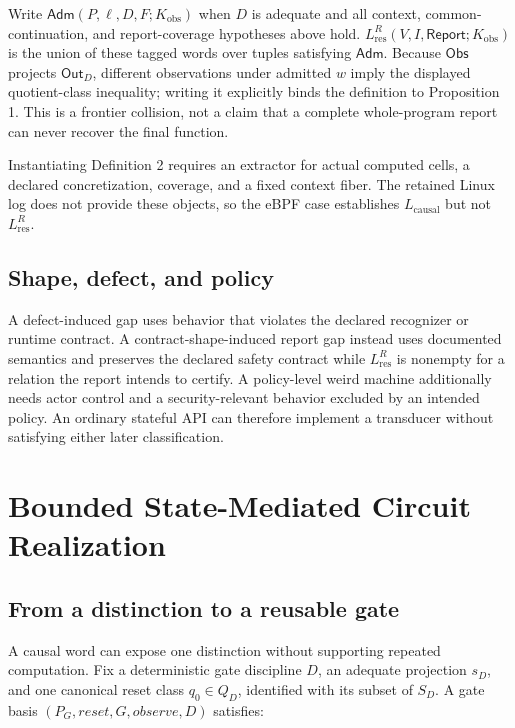 \documentclass[conference]{IEEEtran}
\begin{document}
Write $\mathsf{Adm}(P,\ell,D,F;K_{\mathrm{obs}})$ when $D$ is adequate and all context, common-continuation, and report-coverage hypotheses above hold. $L_{\mathrm{res}}^R(V,I,\mathsf{Report};K_{\mathrm{obs}})$ is the union of these tagged words over tuples satisfying $\mathsf{Adm}$. Because $\mathsf{Obs}$ projects $\mathsf{Out}_D$, different observations under admitted $w$ imply the displayed quotient-class inequality; writing it explicitly binds the definition to Proposition 1. This is a frontier collision, not a claim that a complete whole-program report can never recover the final function.

Instantiating Definition 2 requires an extractor for actual computed cells, a declared concretization, coverage, and a fixed context fiber. The retained Linux log does not provide these objects, so the eBPF case establishes $L_{\mathrm{causal}}$ but not $L_{\mathrm{res}}^R$.

\subsection{Shape, defect, and policy}

A defect-induced gap uses behavior that violates the declared recognizer or runtime contract. A contract-shape-induced report gap instead uses documented semantics and preserves the declared safety contract while $L_{\mathrm{res}}^R$ is nonempty for a relation the report intends to certify. A policy-level weird machine additionally needs actor control and a security-relevant behavior excluded by an intended policy. An ordinary stateful API can therefore implement a transducer without satisfying either later classification.

\section{Bounded State-Mediated Circuit Realization}

\subsection{From a distinction to a reusable gate}

A causal word can expose one distinction without supporting repeated computation. Fix a deterministic gate discipline $D$, an adequate projection $s_D$, and one canonical reset class $q_0\in Q_D$, identified with its subset of $S_D$. A gate basis $(P_G,\mathit{reset},G,\mathit{observe},D)$ satisfies:
\end{document}
